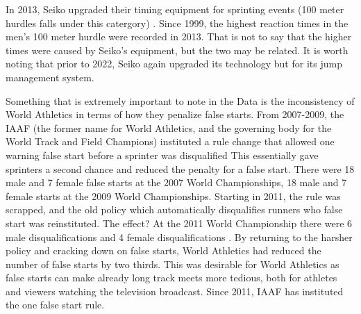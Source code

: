 \documentclass[12pt, letterpaper, titlepage]{article}
\begin{document}
In 2013, Seiko upgraded their timing equipment for sprinting events (100 meter hurdles
falls under this catergory) \citep{WorldAthletics_2013}.  Since 1999, the highest reaction 
times in the men's 100 meter hurdle were recorded in 2013.  That is not to say that the higher 
times were caused by Seiko's equipment, but the two may be related.  It is worth noting that prior
to 2022, Seiko again upgraded its technology but for its jump management system.

Something that is extremely important to note in the Data is the inconsistency of World Athletics 
in terms of how they penalize false starts.  From 2007-2009, the IAAF (the former name for World 
Athletics, and the governing body for the World Track and Field Champions) instituted a rule change
that allowed one warning false start before a sprinter was disqualified \citep{False-Start}  This 
essentially gave sprinters a second chance and reduced the penalty for a false start.  There were 
18 male and 7 female false starts at the 2007 World Championships, 18 male and 7 female starts at 
the 2009 World Championships. Starting in 2011, the rule was scrapped, and the old policy which 
automatically disqualifies runners who false start was reinstituted.  The effect? At the 2011 World
Championship there were 6 male disqualifications and 4 female disqualifications \citep{False-Start}. 
By returning to the harsher policy and cracking down on false starts, World Athletics had reduced the
number of false starts by two thirds. This was desirable for World Athletics as false starts can 
make already long track meets more tedious, both for athletes and viewers watching the 
television broadcast.  Since 2011, IAAF has instituted the one false start rule.\citep{Pilianidis}
\end{document}
